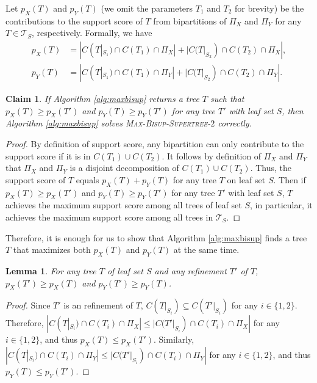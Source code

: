 \documentclass{bmcart}
\newtheorem{lemma}{Lemma}
\newtheorem{claim}{Claim}
\begin{document}
Let $p_X(T)$ and $p_Y(T)$ (we omit the parameters $T_1$ and $T_2$ for brevity) be the contributions to the support score of $T$ from bipartitions of $\Pi_X$ and $\Pi_Y$ for any $T \in \mathcal{T}_S$, respectively. Formally, we have 
\begin{align*}
    p_X(T) &= |C(T|_{S_1}) \cap C(T_1) \cap \Pi_X| + |C(T|_{S_2}) \cap C(T_2) \cap \Pi_X|,\\
    p_Y(T) &= |C(T|_{S_1}) \cap C(T_1) \cap \Pi_Y| + |C(T|_{S_2}) \cap C(T_2) \cap \Pi_Y|.
\end{align*}

\begin{claim} \label{claim:sum_score_solves_prob}
    If Algorithm \ref{alg:maxbisup} returns a tree $T$ such that $p_X(T) \ge p_X(T')$ and $p_Y(T) \ge p_Y(T')$ for any tree $T'$ with leaf set $S$, then Algorithm \ref{alg:maxbisup} solves \textsc{Max-Bisup-Supertree-$2$} correctly.
\end{claim}
\begin{proof}
By definition of support score, any bipartition can only contribute to the support score if it is in $C(T_1) \cup C(T_2)$. It follows by definition of $\Pi_X$ and $\Pi_Y$ that $\Pi_X$ and $\Pi_Y$ is a disjoint decomposition of $C(T_1) \cup C(T_2)$. Thus, the support score of $T$ equals $p_X(T) + p_Y(T)$ for any tree $T$ on leaf set $S$. Then if $p_X(T) \ge p_X(T')$ and $p_Y(T) \ge p_Y(T')$ for any tree $T'$ with leaf set $S$, $T$ achieves the maximum support score among all trees of leaf set $S$, in particular, it achieves the maximum support score among all trees in $\mathcal{T}_S$.
\end{proof}
Therefore, it is enough for us to show that Algorithm \ref{alg:maxbisup} finds a tree $T$ that maximizes both $p_X(T)$ and $p_Y(T)$ at the same time.


\begin{lemma}\label{lem:refine_only_increases}
    For any tree $T$ of leaf set $S$ and any refinement $T'$ of $T$, $p_X(T')\ge p_X(T)$ and $p_Y(T') \ge p_Y(T)$.
\end{lemma}
\begin{proof}
    Since $T'$ is an refinement of $T$, $C(T|_{S_i}) \subseteq C(T'|_{S_i})$ for any $i \in \{1,2\}$. Therefore, $|C(T|_{S_i}) \cap C(T_i) \cap \Pi_X| \le |C(T'|_{S_i}) \cap C(T_i) \cap \Pi_X|$ for any $i \in \{1,2\}$, and thus $p_X(T) \le p_X(T')$. Similarly, $|C(T|_{S_i}) \cap C(T_i) \cap \Pi_Y| \le |C(T'|_{S_i}) \cap C(T_i) \cap \Pi_Y|$ for any $i \in \{1,2\}$, and thus $p_Y(T) \le p_Y(T')$.
\end{proof}
\end{document}
